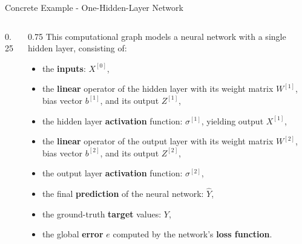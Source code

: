 \begin{frame}{Concrete Example - One-Hidden-Layer Network}
\begin{columns}
\begin{column}{0.25\textwidth}
\begin{center}
{\begin{tikzpicture}
					\end{tikzpicture}
				}
			\end{center}
		\end{column}
		\begin{column}{0.75\textwidth}
			This computational graph models a neural network with a single hidden layer, consisting of:
			\begin{itemize}
				\item the \textbf{inputs}: $X^{[0]}$,
				\item the \textbf{linear} operator of the hidden layer with its weight matrix $W^{[1]}$, bias vector $b^{[1]}$, and its output $Z^{[1]}$,
				\item the hidden layer \textbf{activation} function: $\sigma^{[1]}$, yielding output $X^{[1]}$,
				\item the \textbf{linear} operator of the output layer with its weight matrix $W^{[2]}$, bias vector $b^{[2]}$, and its output $Z^{[2]}$,
				\item the output layer \textbf{activation} function: $\sigma^{[2]}$,
				\item the final \textbf{prediction} of the neural network: $\hat{Y}$,
				\item the ground-truth \textbf{target} values: $Y$,
				\item the global \textbf{error} $e$ computed by the network's \textbf{loss function}.
			\end{itemize}
		\end{column}
	\end{columns}
\end{frame}

